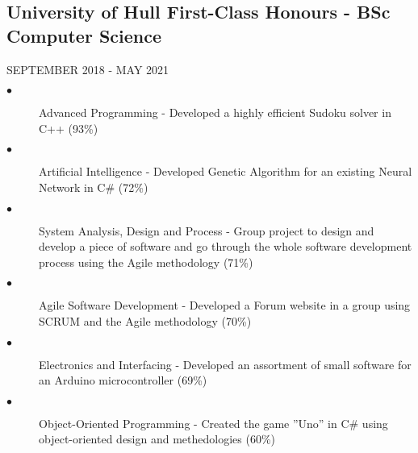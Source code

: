 \documentclass{article}
\begin{document}
\begin{minipage}[t]{0.48\textwidth}
    \subsection{University of Hull First-Class Honours \textnormal{- BSc Computer Science}}
    \footnotesize{SEPTEMBER 2018 - MAY 2021}
    \normalsize{}
    \begin{description}
        \item[$\bullet$]Advanced Programming - Developed a highly efficient Sudoku solver in C++ (93\%)
        \item[$\bullet$]Artificial Intelligence - Developed Genetic Algorithm for an existing Neural Network in C\# (72\%)
        \item[$\bullet$]System Analysis, Design and Process - Group project to design and develop a piece of software and go through the whole software development process using the Agile methodology (71\%)
        \item[$\bullet$]Agile Software Development - Developed a Forum website in a group using SCRUM and the Agile methodology (70\%)
        \item[$\bullet$]Electronics and Interfacing - Developed an assortment of small software for an Arduino microcontroller (69\%)
        \item[$\bullet$]Object-Oriented Programming - Created the game ”Uno” in C\# using object-oriented design and methedologies (60\%)
    \end{description}
\end{minipage}
\end{document}
